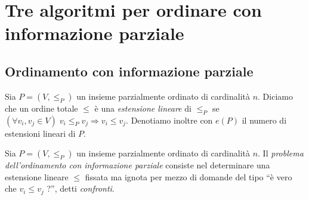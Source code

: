 \chapter{Tre algoritmi per ordinare con informazione parziale}

\section{Ordinamento con informazione parziale} 
\begin{definition}
	Sia \(P=\left(V,\le_{P}\right)\) un insieme parzialmente ordinato di cardinalit\`a \(n\). Diciamo che un ordine totale \(\le\) \`e una \emph{estensione lineare} di \(\le_{P}\) se \((\forall v_i, v_j\in V)\;v_i\le_{P} v_j\Rightarrow v_i\le v_j\). Denotiamo inoltre con \(e(P)\) il numero di estensioni lineari di \(P\). 
\end{definition}
\begin{definition}
	Sia \(P=(V,\le_{P})\) un insieme parzialmente ordinato di cardinalit\`a \(n\). Il \emph{problema dell'ordinamento con informazione parziale} consiste nel determinare una estensione lineare \(\le\) fissata ma ignota per mezzo di domande del tipo ``\`e vero che \(v_i\le v_j\) ?'', detti \emph{confronti}. 
\end{definition}
